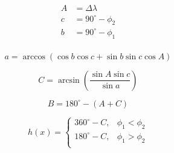 \documentclass[12pt]{article}
\begin{document}
\begin{equation}
\begin{aligned}
A &=\Delta \lambda \\
c &=90^\circ - \phi_2 \\
b &=90^\circ - \phi_1 \\
\end{aligned}
\end{equation}

\begin{equation}
a = \arccos{(\cos{b}\cos{c} + \sin{b}\sin{c}\cos{A})}
\end{equation}

\begin{equation}
C =\arcsin{\left( \frac{\sin{A}\sin{c}}{\sin{a}} \right)}
\end{equation}

\begin{equation}
B = 180^\circ - (A + C)
\end{equation}

\begin{equation}
h(x) = \begin{cases}
  360^\circ - C, & \phi_1<\phi_2 \\
  180^\circ - C, & \phi_1>\phi_2 \\
\end{cases}
\end{equation}
  
\end{document}
